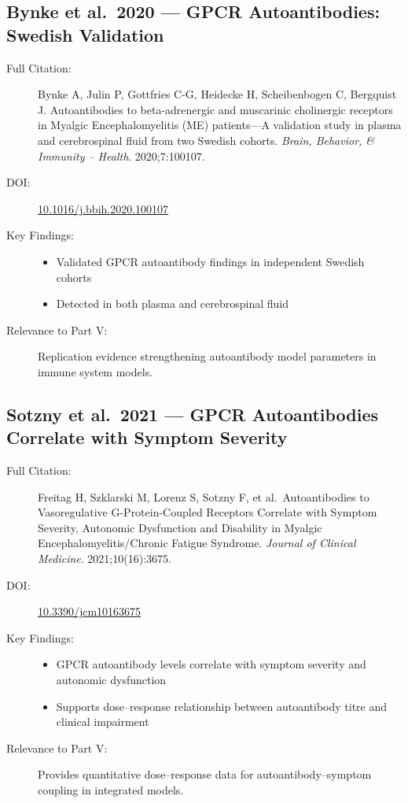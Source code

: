 \subsection{Bynke et al.\ 2020 --- GPCR Autoantibodies: Swedish Validation}

\begin{description}
    \item[Full Citation:] Bynke A, Julin P, Gottfries C-G, Heidecke H, Scheibenbogen C, Bergquist J. Autoantibodies to beta-adrenergic and muscarinic cholinergic receptors in Myalgic Encephalomyelitis (ME) patients---A validation study in plasma and cerebrospinal fluid from two Swedish cohorts. \textit{Brain, Behavior, \& Immunity -- Health}. 2020;7:100107. \cite{Bynke2020}
    \item[DOI:] \href{https://doi.org/10.1016/j.bbih.2020.100107}{10.1016/j.bbih.2020.100107}
    \item[Key Findings:]
    \begin{itemize}
        \item Validated GPCR autoantibody findings in independent Swedish cohorts
        \item Detected in both plasma and cerebrospinal fluid
    \end{itemize}
    \item[Relevance to Part V:] Replication evidence strengthening autoantibody model parameters in immune system models.
\end{description}

\subsection{Sotzny et al.\ 2021 --- GPCR Autoantibodies Correlate with Symptom Severity}

\begin{description}
    \item[Full Citation:] Freitag H, Szklarski M, Lorenz S, Sotzny F, et al.\ Autoantibodies to Vasoregulative G-Protein-Coupled Receptors Correlate with Symptom Severity, Autonomic Dysfunction and Disability in Myalgic Encephalomyelitis/Chronic Fatigue Syndrome. \textit{Journal of Clinical Medicine}. 2021;10(16):3675. \cite{Sotzny2021}
    \item[DOI:] \href{https://doi.org/10.3390/jcm10163675}{10.3390/jcm10163675}
    \item[Key Findings:]
    \begin{itemize}
        \item GPCR autoantibody levels correlate with symptom severity and autonomic dysfunction
        \item Supports dose--response relationship between autoantibody titre and clinical impairment
    \end{itemize}
    \item[Relevance to Part V:] Provides quantitative dose--response data for autoantibody--symptom coupling in integrated models.
\end{description}

